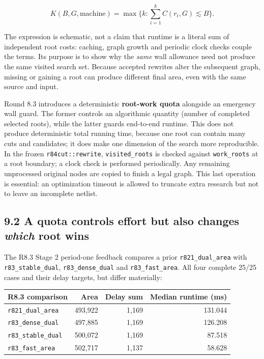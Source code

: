 \documentclass[a4paper,10pt]{article}
\theoremstyle{definition}
\theoremstyle{remark}
\begin{document}
\[
K(B,G,\mathrm{machine})=
\max\biggl\{k:\sum_{i=1}^{k}C(r_i,G)\lesssim B\biggr\}.
\]

The expression is schematic, not a claim that runtime is a literal sum of independent root costs: caching, graph growth and periodic clock checks couple the terms. Its purpose is to show why the \emph{same} wall allowance need not produce the same visited search set. Because accepted rewrites alter the subsequent graph, missing or gaining a root can produce different final area, even with the same source and input.

Round 8.3 introduces a deterministic \textbf{root-work quota} alongside an emergency wall guard. The former controls an algorithmic quantity (number of completed selected roots), while the latter guards end-to-end runtime. This does not produce deterministic total running time, because one root can contain many cuts and candidates; it does make one dimension of the search more reproducible. In the frozen \texttt{r84cut::rewrite}, \texttt{visited\_roots} is checked against \texttt{work\_roots} at a root boundary; a clock check is performed periodically. Any remaining unprocessed original nodes are copied to finish a legal graph. This last operation is essential: an optimization timeout is allowed to truncate extra research but not to leave an incomplete netlist.

\subsection{\texorpdfstring{9.2 A quota controls effort but also changes \emph{which} root wins}{9.2 A quota controls effort but also changes which root wins}}\label{a-quota-controls-effort-but-also-changes-which-root-wins}

The R8.3 Stage 2 period-one feedback compares a prior \texttt{r821\_dual\_area} with \texttt{r83\_stable\_dual}, \texttt{r83\_dense\_dual} and \texttt{r83\_fast\_area}. All four complete 25/25 cases and their delay targets, but differ materially:

\begin{longtable}[]{@{}lrrr@{}}
\toprule\noalign{}
R8.3 comparison & Area & Delay sum & Median runtime (ms) \\
\midrule\noalign{}
\endhead
\bottomrule\noalign{}
\endlastfoot
\texttt{r821\_dual\_area} & 493,922 & 1,169 & 131.044 \\
\texttt{r83\_dense\_dual} & 497,885 & 1,169 & 126.208 \\
\texttt{r83\_stable\_dual} & 500,072 & 1,169 & 87.518 \\
\texttt{r83\_fast\_area} & 502,717 & 1,137 & 58.628 \\
\end{longtable}
\end{document}
